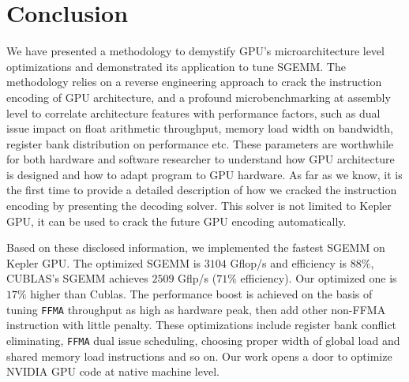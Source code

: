 \section{Conclusion}
\label{sec:conclusion}
We have presented a methodology to demystify GPU's microarchitecture level optimizations and demonstrated its application to tune SGEMM. The methodology relies on a reverse engineering approach to crack the instruction encoding of GPU architecture, and a profound microbenchmarking at assembly level to correlate architecture features with performance factors, such as dual issue impact on float arithmetic throughput, memory load width on bandwidth, register bank distribution on performance etc. These parameters are worthwhile for both hardware and software researcher to understand how GPU architecture is designed and how to adapt program to GPU hardware. As far as we know, it is the first time to provide a detailed description of how we cracked the instruction encoding by presenting the decoding solver. This solver is not limited to Kepler GPU, it can be used to crack the future GPU encoding automatically.

Based on these disclosed information, we implemented the fastest SGEMM on Kepler GPU. The optimized SGEMM is $3104$ Gflop/s and efficiency is $88\%$, CUBLAS's SGEMM achieves $2509$ Gflp/s ($71\%$ efficiency). Our optimized one is $17\%$ higher than Cublas. The performance boost is achieved on the basis of tuning {\tt FFMA} throughput as high as hardware peak, then add other non-FFMA instruction with little penalty. These optimizations include register bank conflict eliminating, {\tt FFMA} dual issue scheduling, choosing proper width of global load and shared memory load instructions and so on. Our work opens a door to optimize NVIDIA GPU code at native machine level.

